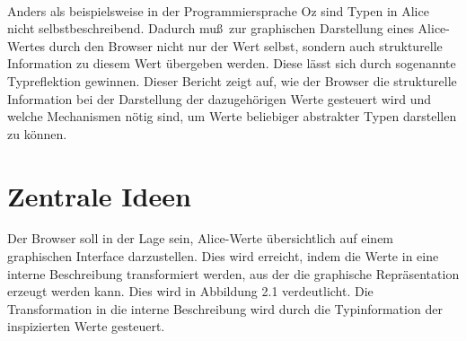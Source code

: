 \documentclass[12pt,a4paper]{article}
\begin{document}
\paragraph{}

Anders als beispielsweise in der Programmiersprache Oz sind 
Typen in Alice nicht selbstbeschreibend. Dadurch mu\ss \, 
zur graphischen Darstellung eines Alice-Wertes durch den 
Browser nicht nur 
der Wert selbst, sondern auch strukturelle 
Information zu diesem Wert \"{u}bergeben werden. Diese l\"{a}sst sich durch 
sogenannte Typreflektion gewinnen. Dieser Bericht zeigt auf, 
wie der Browser die strukturelle Information 
bei der Darstellung der dazugeh\"{o}rigen Werte gesteuert wird und 
welche Mechanismen n\"{o}tig sind, um Werte beliebiger abstrakter Typen 
darstellen zu k\"{o}nnen.



\section{Zentrale Ideen}

Der Browser soll in der Lage sein, Alice-Werte 
\"ubersichtlich auf einem graphischen Interface darzustellen. 
Dies wird erreicht, indem die Werte in eine interne Beschreibung 
transformiert werden, aus der die graphische Repr\"asentation 
erzeugt werden kann. 
Dies wird in Abbildung 2.1 verdeutlicht. 
Die Transformation in 
die interne Beschreibung wird durch die 
Typinformation der inspizierten Werte gesteuert. 


\end{document}
